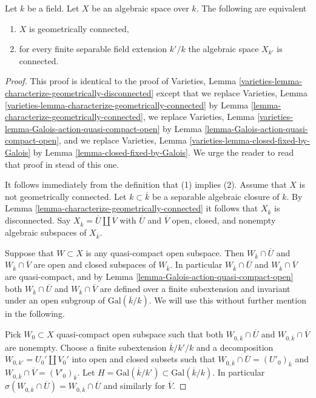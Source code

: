 \begin{lemma}
\label{lemma-characterize-geometrically-disconnected}
Let $k$ be a field. Let $X$ be an algebraic space over $k$.
The following are equivalent
\begin{enumerate}
\item $X$ is geometrically connected,
\item for every finite separable field extension $k'/k$
the algebraic space $X_{k'}$ is connected.
\end{enumerate}
\end{lemma}

\begin{proof}
This proof is identical to the proof of
Varieties, Lemma \ref{varieties-lemma-characterize-geometrically-disconnected}
except that
we replace
Varieties, Lemma \ref{varieties-lemma-characterize-geometrically-connected}
by Lemma \ref{lemma-characterize-geometrically-connected},
we replace
Varieties, Lemma \ref{varieties-lemma-Galois-action-quasi-compact-open}
by Lemma \ref{lemma-Galois-action-quasi-compact-open}, and
we replace
Varieties, Lemma \ref{varieties-lemma-closed-fixed-by-Galois}
by Lemma \ref{lemma-closed-fixed-by-Galois}.
We urge the reader to read that proof in stead of this one.

\medskip\noindent
It follows immediately from the definition that (1) implies (2).
Assume that $X$ is not geometrically connected.
Let $k \subset \overline{k}$ be a separable algebraic
closure of $k$. By
Lemma \ref{lemma-characterize-geometrically-connected}
it follows that $X_{\overline{k}}$ is disconnected.
Say $X_{\overline{k}} = \overline{U} \amalg \overline{V}$
with $\overline{U}$ and $\overline{V}$ open, closed, and nonempty
algebraic subspaces of $X_{\overline{k}}$.

\medskip\noindent
Suppose that $W \subset X$ is any quasi-compact open subspace.
Then $W_{\overline{k}} \cap \overline{U}$ and
$W_{\overline{k}} \cap \overline{V}$ are open and closed subspaces of
$W_{\overline{k}}$. In particular $W_{\overline{k}} \cap \overline{U}$ and
$W_{\overline{k}} \cap \overline{V}$ are quasi-compact, and by
Lemma \ref{lemma-Galois-action-quasi-compact-open}
both $W_{\overline{k}} \cap \overline{U}$ and
$W_{\overline{k}} \cap \overline{V}$
are defined over a finite subextension and invariant under an
open subgroup of $\text{Gal}(\overline{k}/k)$.
We will use this without further mention in the following.

\medskip\noindent
Pick $W_0 \subset X$ quasi-compact open subspace such that both
$W_{0, \overline{k}} \cap \overline{U}$ and
$W_{0, \overline{k}} \cap \overline{V}$ are nonempty.
Choose a finite subextension $\overline{k}/k'/k$
and a decomposition $W_{0, k'} = U_0' \amalg V_0'$ into open and closed
subsets such that
$W_{0, \overline{k}} \cap \overline{U} = (U'_0)_{\overline{k}}$ and
$W_{0, \overline{k}} \cap \overline{V} = (V'_0)_{\overline{k}}$.
Let $H = \text{Gal}(\overline{k}/k') \subset \text{Gal}(\overline{k}/k)$.
In particular
$\sigma(W_{0, \overline{k}} \cap \overline{U}) =
W_{0, \overline{k}} \cap \overline{U}$ and similarly for
$\overline{V}$.


\end{proof}
